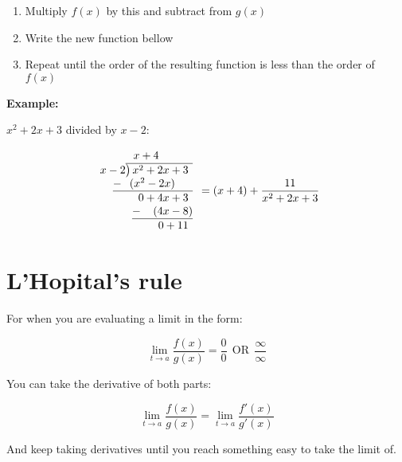 \documentclass{article}
\begin{document}
\begin{multicols}{2}
\begin{enumerate}
\item
Multiply $f(x)$ by this and subtract from $g(x)$

\item
Write the new function bellow

\item
Repeat until the order of the resulting
function is less than the order of $f(x)$

\end{enumerate}

\noindent
\textbf{
Example:
}

$x^2+2x+3$ divided by $x-2$:

\begin{equation*}
\begin{array}{r}
x+4~~~~~~~~\phantom{)}   \\
x-2{\overline{\smash{\big)}\,x^2+2x+3\phantom{)}}}\\
\underline{-~\phantom{(}(x^2-2x)\phantom{-b)}}\\
0+4x+3\phantom{)}\\ 
\underline{-~\phantom{()}(4x-8)}\\ 
0+11\phantom{)}
\end{array}
\\
=(x+4)+\frac{11}{x^2+2x+3}
\end{equation*}

\section*{L'Hopital's rule}

For when you are evaluating a limit in the form:

\begin{equation*}
\lim_{t \to a} \frac{f(x)}{g(x)}
=\frac{0}{0}
~~\text{OR}~~
\frac{\infty}{\infty}
\end{equation*}

\noindent
You can take the derivative of both parts:

\begin{equation*}
\lim_{t \to a} \frac{f(x)}{g(x)}
=\lim_{t \to a} \frac{f'(x)}{g'(x)}
\end{equation*}

\noindent
And keep taking derivatives until you reach something easy
to take the limit of.

\end{multicols}
\end{document}
